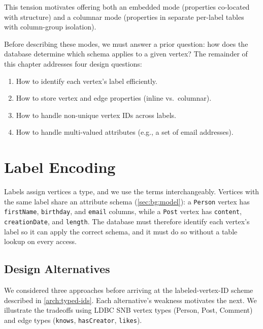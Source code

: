 This tension motivates offering both an embedded mode (properties co-located with structure) and a columnar mode (properties in separate per-label tables with column-group isolation).


Before describing these modes, we must answer a prior question: how does the database determine which schema applies to a given vertex?
The remainder of this chapter addresses four design questions:
\begin{enumerate}
  \item How to identify each vertex's label efficiently.
  \item How to store vertex and edge properties (inline vs.\ columnar).
  \item How to handle non-unique vertex IDs across labels.
  \item How to handle multi-valued attributes (e.g., a set of email addresses).
\end{enumerate}

\section{Label Encoding}
\label{arch:label-encoding}

Labels assign vertices a type, and we use the terms interchangeably.
Vertices with the same label share an attribute schema (\autoref{sec:bg:model}): a \texttt{Person} vertex has \texttt{firstName}, \texttt{birthday}, and \texttt{email} columns, while a \texttt{Post} vertex has \texttt{content}, \texttt{creationDate}, and \texttt{length}.
The database must therefore identify each vertex's label so it can apply the correct schema, and it must do so without a table lookup on every access.

\subsection{Design Alternatives}
\label{arch:label-alternatives}

We considered three approaches before arriving at the labeled-vertex-ID scheme described in \autoref{arch:typed-ids}.
Each alternative's weakness motivates the next.
We illustrate the tradeoffs using LDBC SNB vertex types (Person, Post, Comment) and edge types (\texttt{knows}, \texttt{hasCreator}, \texttt{likes}).

